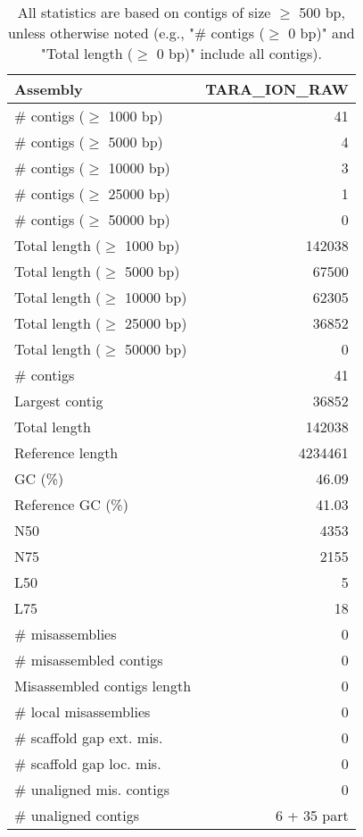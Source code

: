 \documentclass[12pt,a4paper]{article}
\begin{document}
\begin{table}[ht]
\begin{center}
\caption{All statistics are based on contigs of size $\geq$ 500 bp, unless otherwise noted (e.g., "\# contigs ($\geq$ 0 bp)" and "Total length ($\geq$ 0 bp)" include all contigs).}
\begin{tabular}{|l*{1}{|r}|}
\hline
Assembly & TARA\_ION\_RAW \\ \hline
\# contigs ($\geq$ 1000 bp) & 41 \\ \hline
\# contigs ($\geq$ 5000 bp) & 4 \\ \hline
\# contigs ($\geq$ 10000 bp) & 3 \\ \hline
\# contigs ($\geq$ 25000 bp) & 1 \\ \hline
\# contigs ($\geq$ 50000 bp) & 0 \\ \hline
Total length ($\geq$ 1000 bp) & 142038 \\ \hline
Total length ($\geq$ 5000 bp) & 67500 \\ \hline
Total length ($\geq$ 10000 bp) & 62305 \\ \hline
Total length ($\geq$ 25000 bp) & 36852 \\ \hline
Total length ($\geq$ 50000 bp) & 0 \\ \hline
\# contigs & 41 \\ \hline
Largest contig & 36852 \\ \hline
Total length & 142038 \\ \hline
Reference length & 4234461 \\ \hline
GC (\%) & 46.09 \\ \hline
Reference GC (\%) & 41.03 \\ \hline
N50 & 4353 \\ \hline
N75 & 2155 \\ \hline
L50 & 5 \\ \hline
L75 & 18 \\ \hline
\# misassemblies & 0 \\ \hline
\# misassembled contigs & 0 \\ \hline
Misassembled contigs length & 0 \\ \hline
\# local misassemblies & 0 \\ \hline
\# scaffold gap ext. mis. & 0 \\ \hline
\# scaffold gap loc. mis. & 0 \\ \hline
\# unaligned mis. contigs & 0 \\ \hline
\# unaligned contigs & 6 + 35 part \\ \hline

\end{tabular}
\end{center}
\end{table}
\end{document}

